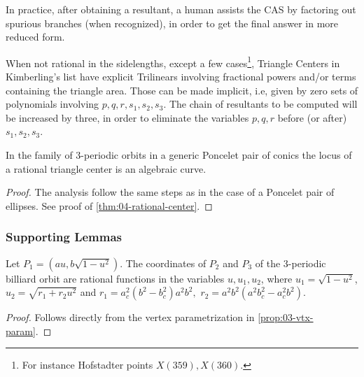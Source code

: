 \begin{remark}
In practice,  after  obtaining  a resultant, a human assists the CAS by factoring out spurious branches
(when recognized), in order to get the final answer in more reduced form.   
\end{remark}

When not rational in the sidelengths, except a few cases\footnote{For instance Hofstadter points $X(359), X(360)$.}, Triangle Centers
in Kimberling's list have explicit Trilinears involving fractional powers and/or terms containing the triangle area. Those can be made implicit, i.e,
given by zero sets of polynomials involving $p,q,r, s_1, s_2, s_3$.  The chain of resultants to be computed will be increased by three, in order to eliminate the variables $p,q, r$ before (or after) $s_1, s_2, s_3$.

 \begin{theorem}\label{thm:loci_algebraic_general}
 In the family of 3-periodic orbits in a generic Poncelet pair of conics the locus of a rational triangle center is an algebraic curve. 
 \end{theorem}

 \begin{proof}
 The analysis follow the same steps as in the case of a Poncelet pair of ellipses.  See proof of \cref{thm:04-rational-center}. 
\end{proof}

\subsubsection{Supporting Lemmas}
\label{sec:supporting-lemmas}

\begin{lemma}
\label{lem:1coord}
Let $P_1=({a}{u},b\sqrt{1-u^2}).$
	The coordinates of $P_2$ and $P_3$ of the 3-periodic billiard orbit are rational functions in the variables $u, u_1, u_2$, where
	$u_1=\sqrt{1-u^2}$, $u_2=\sqrt{r_1+r_2 u^2}$ 
and
	$r_1= a_c^2(b^2 - b_c^2)a^2b^2,$ $ r_2= a^2b^2(a^2b_c^2 - a_c^2b^2)$.  
		
	\end{lemma}
	
	\begin{proof}
	Follows directly from the vertex parametrization in \cref{prop:03-vtx-param}.
\end{proof}
	
